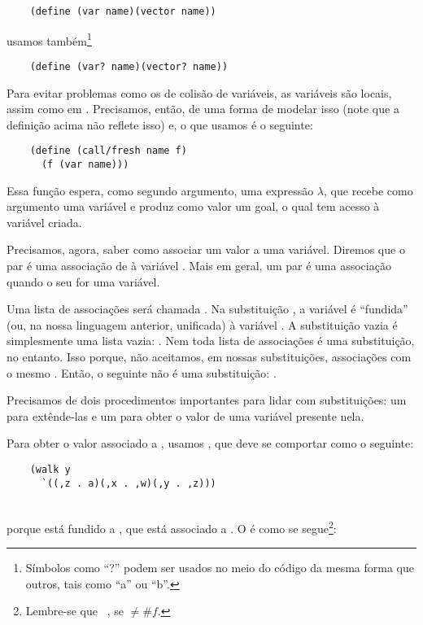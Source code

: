   \begin{lstlisting}
    (define (var name)(vector name))
  \end{lstlisting}

  \noindent usamos também\footnote{Símbolos como ``?'' podem ser
    usados no meio do código da mesma forma que outros, tais como ``a'' ou ``b''.}

  \begin{lstlisting}
    (define (var? name)(vector? name))
  \end{lstlisting}

  Para evitar problemas como os de colisão de variáveis, as variáveis
  são locais, assim como em . Precisamos, então, de
  uma forma de modelar isso (note que a definição acima não reflete
  isso) e, o que usamos é o seguinte:

  \begin{lstlisting}
    (define (call/fresh name f)
      (f (var name)))
  \end{lstlisting}

  Essa função espera, como segundo argumento, uma expressão $\lambda$, que
  recebe como argumento uma variável e produz como valor um goal, o qual
  tem acesso à variável criada.
  
  Precisamos, agora, saber como associar um valor a uma
  variável. Diremos que o par  é uma associação de
   à variável . Mais em geral, um par é uma
  associação quando o seu  for uma variável.

  Uma lista de associações será chamada . Na
  substituição , a variável  é
  ``fundida'' (ou, na nossa linguagem anterior, unificada) à variável
  . A substituição vazia é simplesmente uma lista vazia:
  . Nem toda lista de associações é uma
  substituição, no entanto. Isso porque, não aceitamos, em nossas
  substituições, associações com o mesmo . Então, o
  seguinte não é uma substituição: .

  Precisamos de dois procedimentos importantes para lidar com
  substituições: um para extênde-las e um para obter o valor de uma
  variável presente nela.

  Para obter o valor associado a , usamos ,
  que deve se comportar como o seguinte:
  \begin{lstlisting}
    (walk y
      `((,z . a)(,x . ,w)(,y . ,z)))
  \end{lstlisting}
  \hspace{1cm} \seta\ \\
  porque  está fundido a , que está associado
  a . O  é como se
  segue\footnote{Lembre-se que  \seta\ ,
    se  $\neq \#f$.}:

